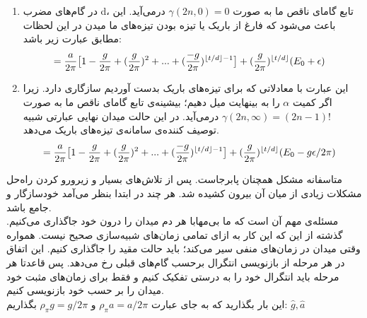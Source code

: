 \begin{enumerate}
	\item 
	در گام‌های مضرب d، تابع گامای ناقص ما به صورت 
	$ \gamma(2n,0) = 0 $
	درمی‌آید. این باعث می‌شود که فارغ از باریک یا تیزه بودن تیزه‌های ما میدن در این لحظات مطابق 		عبارت زیر باشد:
	\begin{align}
		&= \frac{a}{2\pi} \big[ 1 - \frac{g}{2\pi} + (\frac{g}{2\pi})^2 + ... + (\frac{-g}{2\pi})^{\left\lfloor t/d \right\rfloor - 1} \big] + (\frac{g}{2\pi})^{\left\lfloor t/d \right\rfloor} (E_0 + \epsilon)
	\end{align}
	
	\item 
	این عبارت با معادلاتی که برای تیزه‌های باریک بدست آوردیم سازگاری دارد. زیرا اگر کمیت
	$\alpha$
	را به بینهایت میل دهیم؛ بیشینه‌ی تابع گامای ناقص ما به صورت 
	$ \gamma(2n,\infty) = (2n-1)! $
	درمی‌آید. در این حالت میدان نهایی عبارتی شبیه توصیف ‌کننده‌ی سامانه‌ی تیزه‌های باریک می‌دهد.
	\begin{align}
		&= \frac{a}{2\pi} \big[ 1 - \frac{g}{2\pi} + (\frac{g}{2\pi})^2 + ... + (\frac{-g}{2\pi})^{\left\lfloor t/d \right\rfloor - 1} \big] + (\frac{g}{2\pi})^{\left\lfloor t/d \right\rfloor} (E_0 - g\epsilon/2\pi)
	\end{align}
	
\end{enumerate}


متاسفانه مشکل همچنان پابرجاست. پس از تلاش‌های بسیار و زیرورو کردن راه‌حل مشکلات زیادی از میان آن بیرون کشیده شد. هر چند در ابتدا بنظر می‌آمد خودسازگار و جامع باشد.\\
مسئله‌ی مهم آن است که ما بی‌مهابا هر دم میدان را درون خود جاگذاری می‌کنیم. گذشته از این که این کار به ازای تمامی زمان‌های شبیه‌سازی صحیح نیست. همواره وقتی میدان در زمان‌های منفی سیر می‌کند؛ باید حالت مقید را جاگذاری کنیم. این اتفاق در هر مرحله از بازنویسی انتگرال برحسب گام‌های قبلی رخ می‌دهد. پس قاعدتا هر مرحله باید انتگرال خود را به درستی تفکیک کنیم و فقط برای زمان‌های مثبت خود میدان را بر حسب خود بازنویسی کنیم.\\
این بار بگذارید که به جای عبارت
$\rho_{\pi} a = a/2\pi$
و
$\rho_{\pi} g =  g/2\pi$
بگذاریم:
$\hat{g}, \hat{a}$


